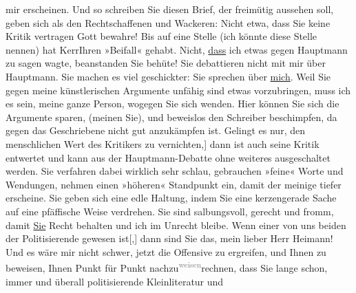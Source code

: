 \begin{ledgroupsized}[t]{13cm}
               mir erscheinen.\pend
           \pstart
           Und so schreiben Sie diesen Brief, der freimütig aussehen soll, geben sich als den
               Rechtschaffenen und Wackeren: Nicht etwa, dass Sie keine Kritik vertragen {\dotstwo} Gott bewahre! Bis auf eine Stelle (ich könnte diese
               Stelle nennen) hat KerrIhren »Beifall« gehabt. Nicht,
                  \uline{dass} ich etwas gegen Hauptmann zu sagen wagte, beanstanden Sie {\dotstwo} behüte! Sie debattieren nicht mit mir über Hauptmann. Sie machen es viel geschickter: Sie
               sprechen über \uline{mich}. Weil Sie gegen meine
               künstlerischen Argumente unfähig sind etwas vorzubringen, muss ich es sein, meine
               ganze Person, wogegen Sie sich wenden. Hier können Sie sich die Argumente sparen,
               (meinen Sie), und beweislos den Schreiber beschimpfen, da gegen das Geschriebene
               nicht gut anzukämpfen ist. Gelingt es nur, den menschlichen Wert des Kritikers zu
                  vernichten\strikeout{n}{[},{]} dann ist auch
               seine Kritik entwertet und kann aus der Hauptmann-Debatte ohne weiteres ausgeschaltet werden.\pend
           \pstart
           Sie verfahren dabei wirklich sehr schlau, gebrauchen »feine« Worte und Wendungen,
               nehmen einen »höheren« Standpunkt ein, damit der meinige tiefer erscheine. Sie geben
               sich eine edle Haltung, indem Sie eine kerzengerade Sache auf eine pfäffische Weise
               verdrehen. Sie sind salbungsvoll, gerecht und fromm, damit \uline{Sie} Recht behalten und ich im Unrecht bleibe.\pend
           \pstart
           Wenn einer von uns beiden der Politisierende gewesen ist{[},{]} dann
               sind Sie das, mein lieber Herr Heimann! Und es
               wäre mir nicht schwer, jetzt die Offensive zu ergreifen, und Ihnen zu beweisen, Ihnen
               Punkt für Punkt nachzu\substVorne{}\textsuperscript{\textcolor{gray}{weisen}}{\allowbreak}\substDazwischen{}rechnen\substHinten{}, dass Sie lange schon, immer und überall politisierende Kleinliteratur und

\end{ledgroupsized}
